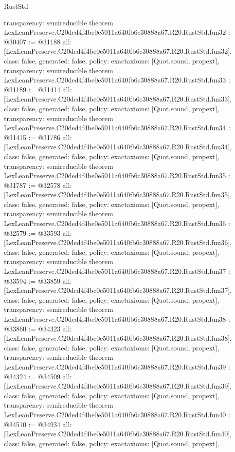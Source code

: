 \begin{lexlean}{RustStd}
\begin{coremodule}
{  transparency: semireducible
}
theorem LexLeanPreserve.C20ded4f4be0e5011a640fb6c30888a67.R20.RustStd.fun32 : @30407 := @31188 {
  all: [LexLeanPreserve.C20ded4f4be0e5011a640fb6c30888a67.R20.RustStd.fun32],
  class: false,
  generated: false,
  policy: exact{axioms: [Quot.sound, propext]},
  transparency: semireducible
}
theorem LexLeanPreserve.C20ded4f4be0e5011a640fb6c30888a67.R20.RustStd.fun33 : @31189 := @31414 {
  all: [LexLeanPreserve.C20ded4f4be0e5011a640fb6c30888a67.R20.RustStd.fun33],
  class: false,
  generated: false,
  policy: exact{axioms: [Quot.sound, propext]},
  transparency: semireducible
}
theorem LexLeanPreserve.C20ded4f4be0e5011a640fb6c30888a67.R20.RustStd.fun34 : @31415 := @31786 {
  all: [LexLeanPreserve.C20ded4f4be0e5011a640fb6c30888a67.R20.RustStd.fun34],
  class: false,
  generated: false,
  policy: exact{axioms: [Quot.sound, propext]},
  transparency: semireducible
}
theorem LexLeanPreserve.C20ded4f4be0e5011a640fb6c30888a67.R20.RustStd.fun35 : @31787 := @32578 {
  all: [LexLeanPreserve.C20ded4f4be0e5011a640fb6c30888a67.R20.RustStd.fun35],
  class: false,
  generated: false,
  policy: exact{axioms: [Quot.sound, propext]},
  transparency: semireducible
}
theorem LexLeanPreserve.C20ded4f4be0e5011a640fb6c30888a67.R20.RustStd.fun36 : @32579 := @33593 {
  all: [LexLeanPreserve.C20ded4f4be0e5011a640fb6c30888a67.R20.RustStd.fun36],
  class: false,
  generated: false,
  policy: exact{axioms: [Quot.sound, propext]},
  transparency: semireducible
}
theorem LexLeanPreserve.C20ded4f4be0e5011a640fb6c30888a67.R20.RustStd.fun37 : @33594 := @33859 {
  all: [LexLeanPreserve.C20ded4f4be0e5011a640fb6c30888a67.R20.RustStd.fun37],
  class: false,
  generated: false,
  policy: exact{axioms: [Quot.sound, propext]},
  transparency: semireducible
}
theorem LexLeanPreserve.C20ded4f4be0e5011a640fb6c30888a67.R20.RustStd.fun38 : @33860 := @34323 {
  all: [LexLeanPreserve.C20ded4f4be0e5011a640fb6c30888a67.R20.RustStd.fun38],
  class: false,
  generated: false,
  policy: exact{axioms: [Quot.sound, propext]},
  transparency: semireducible
}
theorem LexLeanPreserve.C20ded4f4be0e5011a640fb6c30888a67.R20.RustStd.fun39 : @34324 := @34509 {
  all: [LexLeanPreserve.C20ded4f4be0e5011a640fb6c30888a67.R20.RustStd.fun39],
  class: false,
  generated: false,
  policy: exact{axioms: [Quot.sound, propext]},
  transparency: semireducible
}
theorem LexLeanPreserve.C20ded4f4be0e5011a640fb6c30888a67.R20.RustStd.fun40 : @34510 := @34934 {
  all: [LexLeanPreserve.C20ded4f4be0e5011a640fb6c30888a67.R20.RustStd.fun40],
  class: false,
  generated: false,
  policy: exact{axioms: [Quot.sound, propext]},
}
\end{coremodule}
\end{lexlean}
